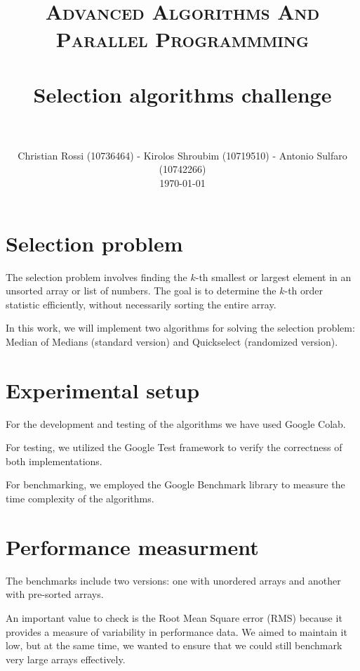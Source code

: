 \documentclass[paper=a4, fontsize=12pt]{scrartcl}
\title{
		\vspace{-1in} 	
		\usefont{OT1}{bch}{b}{n}
		\normalfont \normalsize \textsc{Advanced Algorithms And Parallel Programmming} \\ [25pt]
		\horrule{0.5pt} \\[0.4cm]
		\huge Selection algorithms challenge \\
		\horrule{2pt} \\[0.5cm]
}
\author{
		\normalfont 								\normalsize
        Christian Rossi (10736464) - Kirolos Shroubim (10719510) - Antonio Sulfaro (10742266)\\[-3pt]		\normalsize
        \today
}
\date{}
\numberwithin{equation}{section}
\numberwithin{figure}{section}
\numberwithin{table}{section}
\begin{document}
    \maketitle

    \section{Selection problem}
    The selection problem involves finding the $k$-th smallest or largest element in an unsorted array or list of numbers.
    The goal is to determine the $k$-th order statistic efficiently, without necessarily sorting the entire array.
    
    In this work, we will implement two algorithms for solving the selection problem: Median of Medians (standard version) and Quickselect (randomized version).

    \section{Experimental setup}
    For the development and testing of the algorithms we have used Google Colab.
    
    For testing, we utilized the Google Test framework to verify the correctness of both implementations.
    
    For benchmarking, we employed the Google Benchmark library to measure the time complexity of the algorithms.
    
    \section{Performance measurment}
    The benchmarks include two versions: one with unordered arrays and another with pre-sorted arrays.
    
    An important value to check is the Root Mean Square error (RMS) because it provides a measure of variability in performance data.
    We aimed to maintain it low, but at the same time, we wanted to ensure that we could still benchmark very large arrays effectively.
\end{document}
